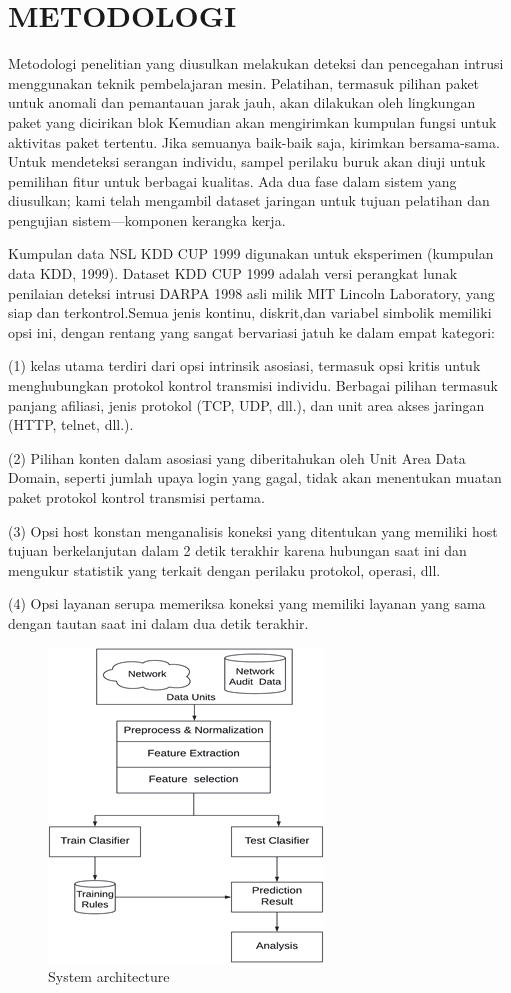 \documentclass[conference]{IEEEtran}
\begin{document}
\section{METODOLOGI}
Metodologi penelitian yang diusulkan melakukan deteksi dan pencegahan intrusi menggunakan teknik pembelajaran mesin. Pelatihan, termasuk pilihan paket untuk anomali dan pemantauan jarak jauh, akan dilakukan oleh lingkungan paket yang dicirikan blok Kemudian akan mengirimkan kumpulan fungsi untuk aktivitas paket tertentu. Jika semuanya baik-baik saja, kirimkan bersama-sama. Untuk mendeteksi serangan individu, sampel perilaku buruk akan diuji untuk pemilihan fitur untuk berbagai
kualitas. Ada dua fase dalam sistem yang diusulkan; kami telah mengambil dataset jaringan untuk tujuan pelatihan dan pengujian sistem—komponen kerangka kerja.

Kumpulan data NSL KDD CUP 1999 digunakan untuk eksperimen (kumpulan data KDD, 1999). Dataset KDD CUP 1999 adalah versi perangkat lunak penilaian deteksi intrusi DARPA 1998 asli milik MIT Lincoln Laboratory, yang siap dan terkontrol.Semua jenis kontinu, diskrit,dan variabel simbolik memiliki opsi ini, dengan rentang yang sangat bervariasi jatuh ke dalam empat kategori:

(1) kelas utama terdiri dari opsi intrinsik asosiasi, termasuk opsi kritis untuk menghubungkan protokol kontrol transmisi individu. Berbagai pilihan termasuk panjang afiliasi, jenis protokol (TCP, UDP, dll.), dan unit area akses jaringan (HTTP, telnet, dll.).

(2) Pilihan konten dalam asosiasi yang diberitahukan oleh Unit Area Data Domain, seperti jumlah upaya login yang gagal, tidak akan menentukan muatan paket protokol kontrol transmisi pertama. 

(3) Opsi host konstan menganalisis koneksi yang ditentukan yang memiliki host tujuan berkelanjutan dalam 2 detik terakhir karena hubungan saat ini dan mengukur statistik yang terkait dengan perilaku protokol, operasi, dll.

(4) Opsi layanan serupa memeriksa koneksi yang memiliki layanan yang sama dengan tautan saat ini dalam dua detik terakhir.

\begin{figure}
\centering
\includegraphics[width=.3\textwidth]{Gambar/pct1.png}
\caption{System architecture}
\end{figure}
\end{document}
